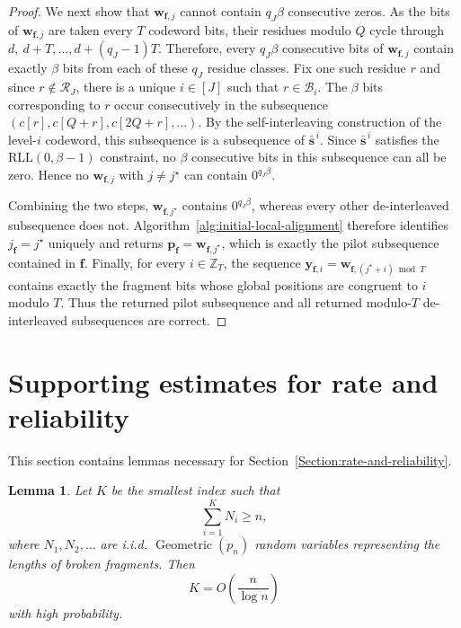\documentclass[journal,letterpaper,onecolumn,11pt]{IEEEtran}
\newcommand{\bZ}{\mathbb{Z}}
\newcommand{\cB}{\mathcal{B}}
\newcommand{\cR}{\mathcal{R}}
\newcommand{\boldf}{\mathbf{f}}
\newcommand{\boldp}{\mathbf{p}}
\newcommand{\bolds}{\mathbf{s}}
\newcommand{\boldw}{\mathbf{w}}
\newcommand{\boldy}{\mathbf{y}}
\newtheorem{lemma}{Lemma}
\begin{document}
\begin{proof}
We next show that \(\boldw_{\boldf,j}\) cannot contain \(q_J\beta\)
consecutive zeros. 
As the bits of \(\boldw_{\boldf,j}\) are taken every
\(T\) codeword bits, their residues modulo \(Q\) cycle through
$d,\ d+T,\ldots,d+(q_J-1)T.$
Therefore, every \(q_J\beta\) consecutive bits of
\(\boldw_{\boldf,j}\) contain exactly \(\beta\) bits from each of these
\(q_J\) residue classes. 
Fix one such residue \(r\) and since \(r\notin\cR_J\), there is a unique \(i\in[J]\) such that \(r\in\cB_i\).  
The \(\beta\) bits corresponding to \(r\) occur consecutively in the subsequence $(c[r],c[Q+r],c[2Q+r],\ldots).$
By the self-interleaving construction of the level-\(i\) codeword, this
 subsequence is a subsequence of \(\bar{\bolds}^{\,i}\).  
 Since \(\bar{\bolds}^{\,i}\) satisfies the \(\mathrm{RLL}(0,\beta-1)\) constraint, no \(\beta\) consecutive bits in this subsequence can all be zero.
 Hence no \(\boldw_{\boldf,j}\) with \(j\neq j^\star\) can contain
\(0^{q_J\beta}\).


Combining the two steps, \(\boldw_{\boldf,j^\star}\) contains
\(0^{q_J\beta}\), whereas every other de-interleaved subsequence does not.
Algorithm~\ref{alg:initial-local-alignment} therefore identifies
\(j_{\boldf}=j^\star\) uniquely and returns
\(\boldp_{\boldf}=\boldw_{\boldf,j^\star}\), which is exactly the pilot
subsequence contained in \(\boldf\).
Finally, for every \(i\in\bZ_T\), the sequence
\(\boldy_{\boldf,i}
=\boldw_{\boldf,(j^\star+i)\bmod T}\) contains exactly the fragment bits
whose global positions are congruent to \(i\) modulo \(T\). 
Thus the returned pilot subsequence and all returned modulo-\(T\) de-interleaved subsequences are correct.
\end{proof}
\section{Supporting estimates for rate and reliability}\label{appendix:rate-reliability-estimates}

This section contains lemmas necessary for Section~\ref{Section:rate-and-reliability}.
\begin{lemma}\label{lemma:number-of-fragments}
 Let $K$ be the smallest index such that
\[
    \sum_{i=1}^{K} N_i \ge n,
\]
where $N_1,N_2,\ldots$ are i.i.d. $\operatorname{Geometric}(p_n)$ random variables representing the lengths of broken fragments. Then
\[
    K = O\!\left(\frac{n}{\log n}\right)
\]
with high probability.
\end{lemma}
\end{document}
